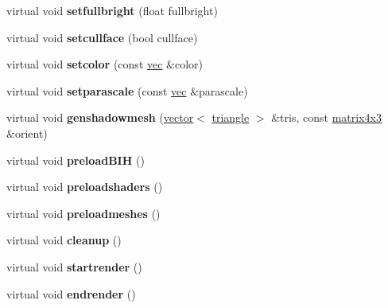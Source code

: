 \begin{DoxyCompactItemize}
\mbox{\label{structmodel_a6346797a5ce104c494c3fd9af2dfa132}} 
virtual void {\bfseries setfullbright} (float fullbright)
\item 
\mbox{\label{structmodel_a768210ace939f49078c7fac116390682}} 
virtual void {\bfseries setcullface} (bool cullface)
\item 
\mbox{\label{structmodel_a1b3bfac5baa427b0aae55a0c1f56d0a7}} 
virtual void {\bfseries setcolor} (const \hyperlink{structvec}{vec} \&color)
\item 
\mbox{\label{structmodel_adaef62e1b13a4a550c6a9d361f5e3081}} 
virtual void {\bfseries setparascale} (const \hyperlink{structvec}{vec} \&parascale)
\item 
\mbox{\label{structmodel_ac1940fa91b03e6b0c0e5a379a46b1511}} 
virtual void {\bfseries genshadowmesh} (\hyperlink{structvector}{vector}$<$ \hyperlink{structtriangle}{triangle} $>$ \&tris, const \hyperlink{structmatrix4x3}{matrix4x3} \&orient)
\item 
\mbox{\label{structmodel_af0af710b67e06f6aa7ff0270099c7b42}} 
virtual void {\bfseries preload\+B\+IH} ()
\item 
\mbox{\label{structmodel_ad89f90897f7431c23ba238dbe8fb9116}} 
virtual void {\bfseries preloadshaders} ()
\item 
\mbox{\label{structmodel_a367a7a446b3e00475f3320125980cd55}} 
virtual void {\bfseries preloadmeshes} ()
\item 
\mbox{\label{structmodel_a797c1d6c97ce4ff039805cbda153ab9d}} 
virtual void {\bfseries cleanup} ()
\item 
\mbox{\label{structmodel_a8eb6511477814d4797aaae68a7585132}} 
virtual void {\bfseries startrender} ()
\item 
\mbox{\label{structmodel_a8071edbee170b63dfd640cd0c9e64341}} 
virtual void {\bfseries endrender} ()
\item 
\mbox{\label{structmodel_abb8c32990048aad7d7091024264b24b5}} 

\end{DoxyCompactItemize}
